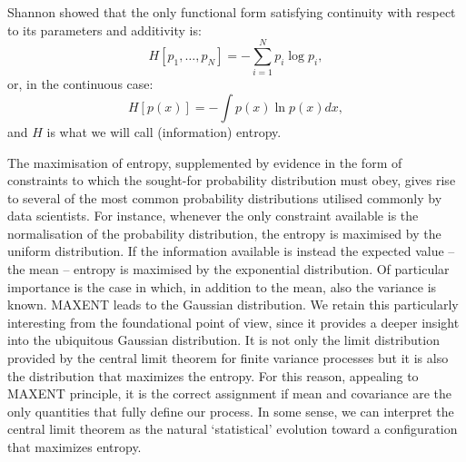 \documentclass[twocolumn,showpacs,preprintnumbers,nofootinbib,prd,
superscriptaddress,10pt]{revtex4-1}
\begin{document}
Shannon \cite{Shannon} showed that the only functional form satisfying continuity with respect to its parameters and additivity is:
\begin{equation}\label{eq:entropy}
    H[p_1, \dots, p_N] = - \sum_{i = 1}^N p_i\log{p_i},
\end{equation}
or, in the continuous case:
\begin{equation}
    H[p(x)] = - \int p(x)\ln p(x) dx,
\end{equation}
and $H$ is what we will call (information) entropy.

The maximisation of entropy, supplemented by evidence in the form of constraints to which the sought-for probability distribution must obey,
gives rise to several of the most common probability distributions utilised commonly by data scientists. For instance, whenever the only constraint available is the normalisation of the probability distribution, the entropy is maximised by the uniform distribution. 
If the information available is instead the expected value -- the mean -- entropy is maximised by the  exponential distribution. Of particular importance is 
the case in which, in addition to the mean, also the variance is known. MAXENT leads to the Gaussian distribution. 
We retain this particularly interesting from the foundational point of view, since it provides a deeper insight into the ubiquitous Gaussian distribution.
It is not only the limit distribution provided by the central limit theorem for finite variance processes but it is also the distribution that maximizes the entropy. For this reason, appealing to MAXENT principle, it is the correct assignment if mean and covariance are the only quantities that fully define our process. In some sense, we can interpret the central limit theorem as the natural `statistical' evolution toward a configuration that maximizes entropy. 
\end{document}
